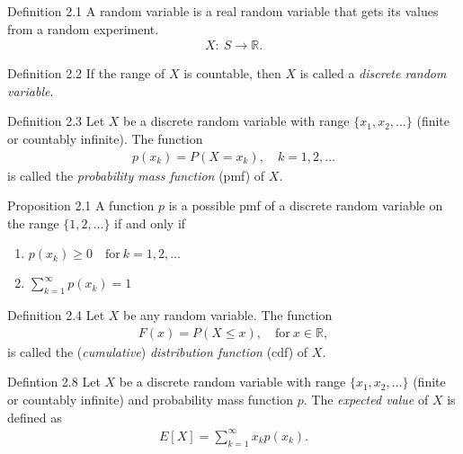 \begin{boks}{Definition 2.1}
A random variable is a real random variable that gets its values from a random experiment.
\begin{align*}
    X: \ S \rightarrow \mathbb{R}.
\end{align*}
\end{boks}

\begin{boks}{Definition 2.2}
If the range of $X$ is countable, then $X$ is called a \textit{discrete random variable}.
\end{boks}

\begin{boks}{Definition 2.3}
Let $X$ be a discrete random variable with range $\{x_1, x_2, \ldots\}$ (finite or countably infinite). The function
\begin{align*}
    p(x_k) = P(X = x_k), \quad k = 1,2,\ldots
\end{align*}
is called the \textit{probability mass function} (pmf) of $X$.
\end{boks}

\begin{boks}{Proposition 2.1}
A function $p$ is a possible pmf of a discrete random variable on the range $\{1,2,\ldots\}$ if and only if
\begin{enumerate}
    \item $p(x_k)\geq 0 \quad \text{for} \ k = 1,2,\ldots$
    \item $\sum_{k=1}^\infty p(x_k) = 1$
\end{enumerate}
\end{boks}

\begin{boks}{Definition 2.4}
Let $X$ be any random variable. The function
\begin{align*}
    F(x) = P(X\leq x), \quad \text{for} \ x\in \mathbb{R},
\end{align*}
is called the (\textit{cumulative}) \textit{distribution function} (cdf) of $X$.
\end{boks}

\begin{boks}{Defintion 2.8}
Let $X$ be a discrete random variable with range $\{x_1,x_2, \ldots\}$ (finite or countably infinite) and probability mass function $p$. The \textit{expected value} of $X$ is defined as
\begin{align*}
    E[X] = \sum_{k=1}^\infty x_k p(x_k).
\end{align*}
\end{boks}

